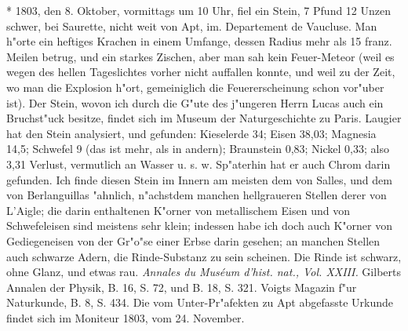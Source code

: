 \documentclass[a4paper, 11pt, oneside, polutonikogreek, german]{article}
\begin{document}
* 1803, den 8. Oktober, vormittags um 10 Uhr, fiel ein Stein, 7 Pfund 12 Unzen schwer, bei Saurette, nicht weit von Apt, im. Departement de Vaucluse. Man h"orte ein heftiges Krachen in einem Umfange, dessen Radius mehr als 15 franz. Meilen betrug, und ein starkes Zischen, aber man sah kein Feuer-Meteor (weil es wegen des hellen Tageslichtes vorher nicht auffallen konnte, und weil zu der Zeit, wo man die Explosion h"ort, gemeiniglich die Feuererscheinung schon vor"uber ist). Der Stein, wovon ich durch die G"ute des j"ungeren Herrn Lucas auch ein Bruchst"uck besitze, findet sich im Museum der Naturgeschichte zu Paris. Laugier hat den Stein analysiert, und gefunden: Kieselerde 34; Eisen 38,03; Magnesia 14,5; Schwefel 9 (das ist mehr, als in andern); Braunstein 0,83; Nickel 0,33; also 3,31 Verlust, vermutlich an Wasser u. s. w. Sp"aterhin hat er auch Chrom darin gefunden. Ich finde diesen Stein im Innern am meisten dem von Salles, und dem von Berlanguillas "ahnlich, n"achstdem manchen hellgraueren Stellen derer von L'Aigle; die darin enthaltenen K"orner von metallischem Eisen und von Schwefeleisen sind meistens sehr klein; indessen habe ich doch auch K"orner von Gediegeneisen von der Gr"o"se einer Erbse darin gesehen; an manchen Stellen auch schwarze Adern, die Rinde-Substanz zu sein scheinen. Die Rinde ist schwarz, ohne Glanz, und etwas rau. \emph{Annales du Muséum d'hist. nat., Vol. XXIII.} Gilberts Annalen der Physik, B. 16, S. 72, und B. 18, S. 321. Voigts Magazin f"ur Naturkunde, B. 8, S. 434. Die vom Unter-Pr"afekten zu Apt abgefasste Urkunde findet sich im Moniteur 1803, vom 24. November.
\end{document}
